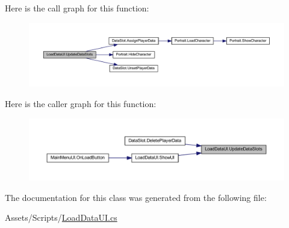 Here is the call graph for this function\+:
\nopagebreak
\begin{figure}[H]
\begin{center}
\leavevmode
\includegraphics[width=350pt]{class_load_data_u_i_a2a36a17c6455a8ca8ee3b92dbbce0503_cgraph}
\end{center}
\end{figure}
Here is the caller graph for this function\+:
\nopagebreak
\begin{figure}[H]
\begin{center}
\leavevmode
\includegraphics[width=350pt]{class_load_data_u_i_a2a36a17c6455a8ca8ee3b92dbbce0503_icgraph}
\end{center}
\end{figure}


The documentation for this class was generated from the following file\+:\begin{DoxyCompactItemize}
\item 
Assets/\+Scripts/\mbox{\hyperlink{_load_data_u_i_8cs}{Load\+Data\+U\+I.\+cs}}\end{DoxyCompactItemize}

